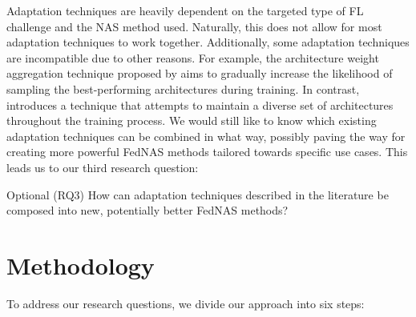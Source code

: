 Adaptation techniques are heavily dependent on the targeted type of FL challenge and the NAS method used. Naturally, this does not allow for most adaptation techniques to work together. Additionally, some adaptation techniques are incompatible due to other reasons. For example, the architecture weight aggregation technique proposed by \cite{efnas_2024} aims to gradually increase the likelihood of sampling the best-performing architectures during training. In contrast, \cite{superfednas_2024} introduces a technique that attempts to maintain a diverse set of architectures throughout the training process. We would still like to know which existing adaptation techniques can be combined in what way, possibly paving the way for creating more powerful FedNAS methods tailored towards specific use cases. This leads us to our third research question:

\vspace{1em}
Optional (RQ3) How can adaptation techniques described in the literature be composed into new, potentially better FedNAS methods?
\vspace{1em}

\section{Methodology}


To address our research questions, we divide our approach into six steps:

